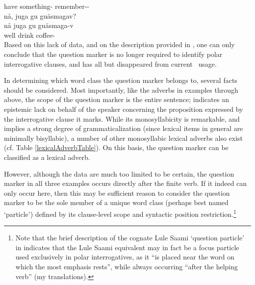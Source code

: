 	have\BS{}   something- remember--\\\nopagebreak
{}  %
\z
\ea\label{Qpart3}
\glll	nå, juga gu guäsmagav?\\
	nå juga gu guäsmaga-v\\
	well drink\BS{}  coffee-\\\nopagebreak
{} %
\z
Based on this lack of data, and on the description provided in \citet{Lagercrantz1926}, 
one can only conclude that the question marker is no longer required to identify polar interrogative clauses, and has all but disappeared from current \PS\ usage. %

In determining which word class the question marker belongs to, several facts should be considered. %
Most importantly, like the adverbs in examples  through  above, the scope of the question marker is the entire sentence; \TILDE{} indicates an epistemic lack on behalf of the speaker concerning the proposition expressed by the interrogative clause it marks. While its monosyllabicity is remarkable, and implies a strong degree of grammaticalization (since lexical items in general are minimally bisyllabic), a number of other monosyllabic lexical adverbs also exist (cf. Table \vref{lexicalAdverbTable}). On this basis, the question marker can be classified as a lexical adverb. 

However, although the data are much too limited to be certain, the question marker in all three examples occurs directly after the finite verb. If it indeed can only occur here, then this may be sufficient reason to consider the question marker to be the sole member of a unique word class (perhaps best named ‘particle’) defined by its clause-level scope and syntactic position restriction.\footnote{Note that the brief description of the cognate Lule Saami ‘question particle’ in \mbox{\citet[95]{Spiik1989}} indicates that the Lule Saami equivalent may in fact be a focus particle used exclusively in polar interrogatives, as it “is placed near the word on which the most emphasis rests”, while always occurring “after the helping verb” (my translations).} %






